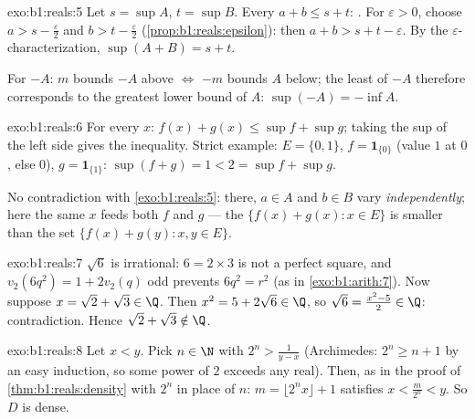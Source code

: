 \begin{solution}{exo:b1:reals:5}
Let $s = \sup A$, $t = \sup B$. Every $a + b \leq s + t$: . For $\varepsilon > 0$, choose $a > s - \frac\varepsilon2$ and
$b > t - \frac\varepsilon2$ (\cref{prop:b1:reals:epsilon}): then $a +
b > s + t - \varepsilon$. By the $\varepsilon$-characterization,
$\sup(A+B) = s + t$.

For $-A$: $m$ bounds $-A$ above $\iff$ $-m$ bounds $A$ below; the
least  of $-A$ therefore corresponds to the greatest lower
bound of $A$: $\sup(-A) = -\inf A$.
\end{solution}

\begin{solution}{exo:b1:reals:6}
For every $x$: $f(x) + g(x) \leq \sup f + \sup g$; taking the sup of
the left side gives the inequality. Strict example: $E = \{0, 1\}$,
$f = \mathbf{1}_{\{0\}}$ (value $1$ at $0$, else $0$), $g =
\mathbf{1}_{\{1\}}$: $\sup(f + g) = 1 < 2 = \sup f + \sup g$.

No contradiction with \cref{exo:b1:reals:5}: there, $a \in A$ and $b
\in B$ vary \emph{independently}; here the same $x$ feeds both $f$
and $g$ --- the  $\{f(x) + g(x) : x \in E\}$ is smaller than the
set $\{f(x) + g(y) : x, y \in E\}$.
\end{solution}

\begin{solution}{exo:b1:reals:7}
$\sqrt 6$ is irrational: $6 = 2 \times 3$ is not a perfect square,
and $v_2(6q^2) = 1 + 2v_2(q)$ odd prevents $6q^2 = r^2$ (as in
\cref{exo:b1:arith:7}). Now suppose $x = \sqrt 2 + \sqrt 3 \in \Q$.
Then $x^2 = 5 + 2\sqrt 6 \in \Q$, so $\sqrt 6 = \frac{x^2 - 5}{2} \in
\Q$: contradiction. Hence $\sqrt 2 + \sqrt 3 \notin \Q$.
\end{solution}

\begin{solution}{exo:b1:reals:8}
Let $x < y$. Pick $n \in \N$ with $2^n > \frac{1}{y - x}$ (Archimedes:
$2^n \geq n + 1$ by an easy induction, so some power of $2$ exceeds
any real). Then, as in the proof of \cref{thm:b1:reals:density} with
$2^n$ in place of $n$: $m = \lfloor 2^n x \rfloor + 1$ satisfies $x <
\frac{m}{2^n} < y$. So $D$ is dense.
\end{solution}

